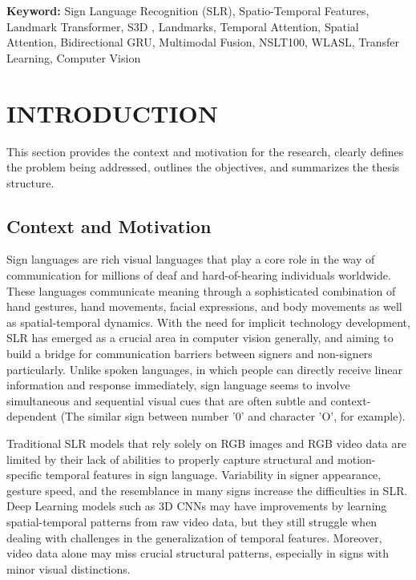 \documentclass{article}
\begin{document}
\vspace{1cm}
\textbf{Keyword:} Sign Language Recognition (SLR), Spatio-Temporal Features, Landmark Transformer, S3D , Landmarks, Temporal Attention, Spatial Attention, Bidirectional GRU, Multimodal Fusion, NSLT100, WLASL, Transfer Learning, Computer Vision

\newpage

\section{INTRODUCTION}

This section provides the context and motivation for the research, clearly defines the problem being addressed, outlines the objectives, and summarizes the thesis structure.

\subsection{Context and Motivation}

Sign languages are rich visual languages that play a core role in the way of communication for millions of deaf and hard-of-hearing individuals worldwide. These languages communicate meaning through a sophisticated combination of hand gestures, hand movements, facial expressions, and body movements as well as spatial-temporal dynamics. With the need for implicit technology development, SLR has emerged as a crucial area in computer vision generally, and aiming to build a bridge for communication barriers between signers and non-signers particularly. Unlike spoken languages, in which people can directly receive linear information and response immediately, sign language seems to involve simultaneous and sequential visual cues that are often subtle and context-dependent (The similar sign between number '0' and character 'O', for example).

\vspace{0.5cm}

Traditional SLR models that rely solely on RGB images and RGB video data are limited by their lack of abilities to properly capture structural and motion-specific temporal features in sign language. Variability in signer appearance, gesture speed, and the resemblance in many signs increase the difficulties in SLR. Deep Learning models such as 3D CNNs may have improvements by learning spatial-temporal patterns from raw video data, but they still struggle when dealing with challenges in the generalization of temporal features. Moreover, video data alone may miss crucial structural patterns, especially in signs with minor visual distinctions.
\end{document}
